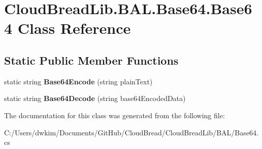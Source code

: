 \hypertarget{class_cloud_bread_lib_1_1_b_a_l_1_1_base64_1_1_base64}{}\section{Cloud\+Bread\+Lib.\+B\+A\+L.\+Base64.\+Base64 Class Reference}
\label{class_cloud_bread_lib_1_1_b_a_l_1_1_base64_1_1_base64}
\subsection*{Static Public Member Functions}
\begin{DoxyCompactItemize}
\item 
static string {\bfseries Base64\+Encode} (string plain\+Text)\hypertarget{class_cloud_bread_lib_1_1_b_a_l_1_1_base64_1_1_base64_a901a46986bd2fb9302c4cd728f09c2d4}{}\label{class_cloud_bread_lib_1_1_b_a_l_1_1_base64_1_1_base64_a901a46986bd2fb9302c4cd728f09c2d4}

\item 
static string {\bfseries Base64\+Decode} (string base64\+Encoded\+Data)\hypertarget{class_cloud_bread_lib_1_1_b_a_l_1_1_base64_1_1_base64_a56f06fb89cb0b7b03a4818cecc47b3aa}{}\label{class_cloud_bread_lib_1_1_b_a_l_1_1_base64_1_1_base64_a56f06fb89cb0b7b03a4818cecc47b3aa}

\end{DoxyCompactItemize}


The documentation for this class was generated from the following file\+:\begin{DoxyCompactItemize}
\item 
C\+:/\+Users/dwkim/\+Documents/\+Git\+Hub/\+Cloud\+Bread/\+Cloud\+Bread\+Lib/\+B\+A\+L/Base64.\+cs\end{DoxyCompactItemize}
